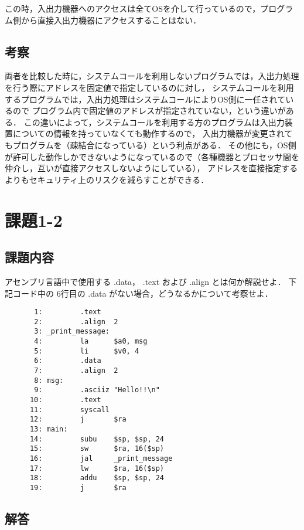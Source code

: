 \documentclass[a4j,11pt]{jarticle}
\begin{document}
この時，入出力機器へのアクセスは全てOSを介して行っているので，プログラム側から直接入出力機器にアクセスすることはない．

\subsection{考察}

両者を比較した時に，システムコールを利用しないプログラムでは，入出力処理を行う際にアドレスを固定値で指定しているのに対し，
システムコールを利用するプログラムでは，入出力処理はシステムコールによりOS側に一任されているので
プログラム内で固定値のアドレスが指定されていない，という違いがある．
この違いによって，システムコールを利用する方のプログラムは入出力装置についての情報を持っていなくても動作するので，
入出力機器が変更されてもプログラムを（疎結合になっている）という利点がある．
その他にも，OS側が許可した動作しかできないようになっているので（各種機器とプロセッサ間を仲介し，互いが直接アクセスしないようにしている），
アドレスを直接指定するよりもセキュリティ上のリスクを減らすことができる．

\section{課題1-2}

\subsection{課題内容}
アセンブリ言語中で使用する .data， .text および .align とは何か解説せよ．
 下記コード中の 6行目の .data がない場合，どうなるかについて考察せよ．

\begin{verbatim}
       1:         .text
       2:         .align  2
       3: _print_message:
       4:         la      $a0, msg
       5:         li      $v0, 4
       6:         .data
       7:         .align  2
       8: msg:
       9:         .asciiz "Hello!!\n"
      10:         .text
      11:         syscall
      12:         j       $ra
      13: main:
      14:         subu    $sp, $sp, 24
      15:         sw      $ra, 16($sp)
      16:         jal     _print_message
      17:         lw      $ra, 16($sp)
      18:         addu    $sp, $sp, 24
      19:         j       $ra
\end{verbatim}

\subsection{解答}
\end{document}
